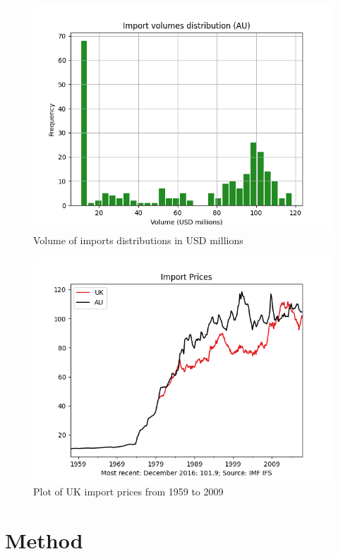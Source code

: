\documentclass[a4paper, 12pt, english]{article}
\begin{document}
\begin{figure}
    \centering
    \includegraphics[scale = 0.7]{Figures/histo.png}
    \caption{Volume of imports distributions in USD millions}
    \label{fig:histo1}
\end{figure}

\begin{figure}
    \centering
    \includegraphics[scale = 0.7]{Figures/plot.png}
    \caption{Plot of UK import prices from 1959 to 2009 }
    \label{fig:plot}
\end{figure}

\newpage
\section{Method}
\blindtext[1]\\
\end{document}
